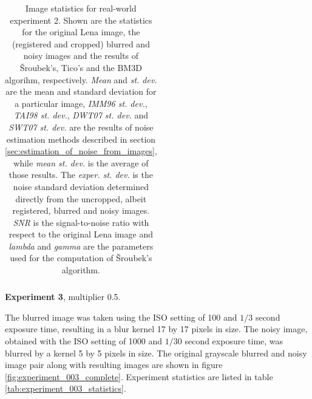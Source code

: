 \documentclass[12pt,notitlepage]{report}
\begin{document}
\begin{table}[htb]
\begin{tabular}{ | l | c | c | c | c | c | c | }
  \end{tabular}
  \caption[Image statistics for real-world experiment 2]{Image statistics for real-world experiment 2. Shown are the statistics for the original Lena image, the (registered and cropped) blurred and noisy images and the results of Šroubek's, Tico's and the BM3D algorihm, respectively. {\em Mean} and {\em st. dev.} are the mean and standard deviation for a particular image, {\em IMM96 st. dev.}, {\em TAI98 st. dev.}, {\em DWT07 st. dev.} and {\em SWT07 st. dev.} are the results of noise estimation methods described in section \ref{sec:estimation_of_noise_from_images}, while {\em mean st. dev.} is the average of those results. The {\em exper. st. dev.} is the noise standard deviation determined directly from the uncropped, albeit registered, blurred and noisy images. {\em SNR} is the signal-to-noise ratio with respect to the original Lena image and {\em lambda} and {\em gamma} are the parameters used for the computation of Šroubek's algorithm.}
  \label{tab:experiment_002_statistics}
\end{table}

\noindent \textbf{Experiment 3}, multiplier 0.5.

The blurred image was taken using the ISO setting of 100 and $1/3$ second exposure time, resulting in a blur kernel 17 by 17 pixels in size. The noisy image, obtained with the ISO setting of 1000 and $1/30$ second exposure time, was blurred by a kernel 5 by 5 pixels in size. The original grayscale blurred and noisy image pair along with resulting images are shown in figure \ref{fig:experiment_003_complete}. Experiment statistics are listed in table \ref{tab:experiment_003_statistics}.
\end{document}
